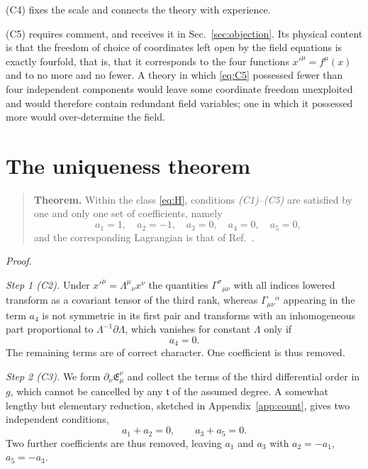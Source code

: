 \documentclass[aps,prd,reprint,amsmath,amssymb,nofootinbib,longbibliography]{revtex4-2}
\begin{document}
(C4) fixes the scale and connects the theory with experience.

(C5) requires comment, and receives it in Sec.~\ref{sec:objection}. Its physical content is that the
freedom of choice of coordinates left open by the field equations is exactly fourfold, that is, that
it corresponds to the four functions $x'^{\mu} = f^{\mu}(x)$ and to no more and no fewer. A theory in
which \eqref{eq:C5} possessed fewer than four independent components would leave some coordinate
freedom unexploited and would therefore contain redundant field variables; one in which it possessed
more would over-determine the field.

\section{The uniqueness theorem}
\label{sec:thm}

\begin{quote}
\textbf{Theorem.} Within the class \eqref{eq:H}, conditions \emph{(C1)}--\emph{(C5)} are satisfied by
one and only one set of coefficients, namely
\begin{equation}
a_1 = 1, \quad a_2 = -1, \quad a_3 = 0, \quad a_4 = 0, \quad a_5 = 0 ,
\label{eq:sol}
\end{equation}
and the corresponding Lagrangian is that of Ref.~\emph{\cite{eingross1913}}.
\end{quote}

\noindent\emph{Proof.}

\emph{Step 1 (C2).} Under $x'^{\mu} = \Lambda^{\mu}{}_{\nu}x^{\nu}$ the quantities
$\Gamma^{\sigma}{}_{\mu\nu}$ with all indices lowered transform as a covariant tensor of the third
rank, whereas $\Gamma_{\mu\nu}{}^{\alpha}$ appearing in the term $a_4$ is not symmetric in its
first pair and transforms with an inhomogeneous part proportional to
$\Lambda^{-1}\partial\Lambda$, which vanishes for constant $\Lambda$ only if
\begin{equation}
a_4 = 0 .
\label{eq:a4}
\end{equation}
The remaining terms are of correct character. One coefficient is thus removed.

\emph{Step 2 (C3).} We form $\partial_{\nu}\mathfrak{E}^{\nu}_{\mu}$ and collect the terms of the
third differential order in $g$, which cannot be cancelled by any $\mathfrak{t}$ of the assumed
degree. A somewhat lengthy but elementary reduction, sketched in Appendix~\ref{app:count}, gives
two independent conditions,
\begin{equation}
a_1 + a_2 = 0 , \qquad a_3 + a_5 = 0 .
\label{eq:C3res}
\end{equation}
Two further coefficients are thus removed, leaving $a_1$ and $a_3$ with $a_2 = -a_1$,
$a_5 = -a_3$.
\end{document}
